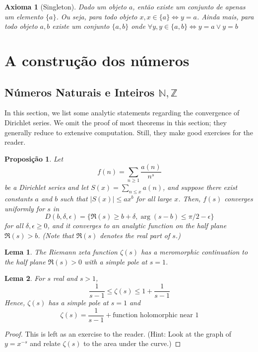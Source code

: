 \documentclass{article}
\newcommand{\NN}{\mathbb{N}}
\newcommand{\ZZ}{\mathbb{Z}}
\theoremstyle{plain}
\newtheorem{prop}{Proposição}
\newtheorem{lemma}{Lema}
\newtheorem{axm}{Axioma}
\theoremstyle{remark}
\numberwithin{equation}{section}
\numberwithin{thm}{section}
\numberwithin{defn}{section}
\numberwithin{lemma}{section}
\numberwithin{axm}{section}
\begin{document}
\begin{axm}[Singleton]\label{axm1:3}
Dado um objeto \(a\), então existe um conjunto  de apenas um elemento \(\{a\}\). Ou seja, para todo objeto \(x, x \in \{a\} \iff y = a\). Ainda mais, para todo objeto \(a, b\) existe um conjunto \(\{a,b\}\) onde \(\forall y, y \in \{a,b\} \iff y = a \vee y = b\) 

\end{axm}

\section{A construção dos números}
\subsection{Números Naturais e Inteiros \(\NN, \ZZ\)}

In this section, we list some analytic statements regarding the convergence of Dirichlet series. We omit the proof of most theorems in this section; they generally reduce to extensive computation. Still, they make good exercises for the reader. 

\begin{prop} \label{2.1}
Let $$f(n) = \sum_{n \ge 1} \frac{a(n)}{n^s}$$ be a Dirichlet series and let $S(x) = \sum_{n \le x} a(n)$, and suppose there exist constants $a$ and $b$ such that $|S(x)| \le ax^b$ for all large $x$. Then, $f(s)$ converges uniformly for $s$ in $$D(b, \delta, \epsilon) = \{\Re(s) \ge b + \delta, \arg(s-b) \le \pi/2 - \epsilon\}$$ for all $\delta, \epsilon \ge 0$, and it converges to an analytic function on the half plane $\Re(s) > b$. (Note that $\Re(s)$ denotes the real part of $s$.)
\end{prop}

\begin{lemma}
The Riemann zeta function $\zeta(s)$ has a meromorphic continuation to the half plane $\Re(s) > 0$ with a simple pole at $s = 1$.
\end{lemma}

\begin{lemma}
For $s$ real and $s > 1$, $$\frac{1}{s-1} \le \zeta(s) \le 1 + \frac{1}{s-1}$$ Hence, $\zeta(s)$ has a simple pole at $s = 1$ and $$\zeta(s) = \frac{1}{s-1} + \text{function holomorphic near } 1$$
\end{lemma}

\begin{proof}
This is left as an exercise to the reader. (Hint: Look at the graph of $y = x^{-s}$ and relate $\zeta(s)$ to the area under the curve.)
\end{proof}
\end{document}
